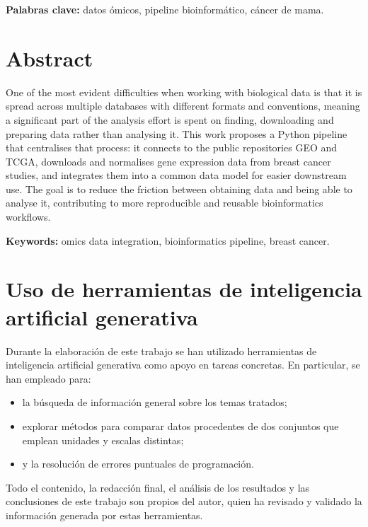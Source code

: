 \documentclass[12pt, a4paper]{report}
\newcommand{\unnumberedchapternotoc}[1]{%
  \chapter*{#1}%
}
\begin{document}
\textbf{Palabras clave:} datos ómicos, pipeline bioinformático, cáncer de mama.

\vfill


\clearpage

\unnumberedchapternotoc{Abstract}

One of the most evident difficulties when working with biological data is that it is spread across multiple databases with different formats and conventions, meaning a significant part of the analysis effort is spent on finding, downloading and preparing data rather than analysing it. This work proposes a Python pipeline that centralises that process: it connects to the public repositories GEO and TCGA, downloads and normalises gene expression data from breast cancer studies, and integrates them into a common data model for easier downstream use. The goal is to reduce the friction between obtaining data and being able to analyse it, contributing to more reproducible and reusable bioinformatics workflows.

\textbf{Keywords:} omics data integration, bioinformatics pipeline, breast cancer.

\clearpage

\unnumberedchapternotoc{Uso de herramientas de inteligencia artificial generativa}

Durante la elaboración de este trabajo se han utilizado herramientas de inteligencia artificial generativa como apoyo en tareas concretas. En particular, se han empleado para:

\begin{itemize}
  \item la búsqueda de información general sobre los temas tratados;
  \item explorar métodos para comparar datos procedentes de dos conjuntos que emplean unidades y escalas distintas;
  \item y la resolución de errores puntuales de programación.
\end{itemize}

Todo el contenido, la redacción final, el análisis de los resultados y las conclusiones de este trabajo son propios del autor, quien ha revisado y validado la información generada por estas herramientas.
\end{document}
